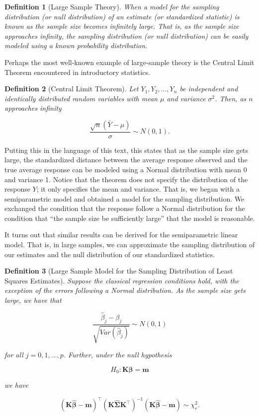 \documentclass[
]{book}
\theoremstyle{plain}
\theoremstyle{mydefn}
\newtheorem{definition}{Definition}[chapter]
\theoremstyle{myexmpl}
\theoremstyle{remark}
\begin{document}
\begin{definition}[Large Sample Theory]
When a model for the sampling distribution (or null distribution) of an estimate (or standardized statistic) is known as the sample size becomes infinitely large. That is, as the sample size approaches infinity, the sampling distribution (or null distribution) can be easily modeled using a known probability distribution.
\end{definition}

Perhaps the most well-known example of large-sample theory is the Central Limit Theorem encountered in introductory statistics.

\begin{definition}[Central Limit Theorem]
Let \(Y_1, Y_2, \dotsc, Y_n\) be independent and identically distributed random variables with mean \(\mu\) and variance \(\sigma^2\). Then, as \(n\) approaches infinity

\[\frac{\sqrt{n}\left(\bar{Y} - \mu\right)}{\sigma} \sim N(0, 1).\]
\end{definition}

Putting this in the language of this text, this states that as the sample size gets large, the standardized distance between the average response observed and the true average response can be modeled using a Normal distribution with mean 0 and variance 1. Notice that the theorem does not specify the distribution of the response \(Y\); it only specifies the mean and variance. That is, we began with a semiparametric model and obtained a model for the sampling distribution. We exchanged the condition that the response follow a Normal distribution for the condition that ``the sample size be sufficiently large'' that the model is reasonable.

It turns out that similar results can be derived for the semiparametric linear model. That is, in large samples, we can approximate the sampling distribution of our estimates and the null distribution of our standardized statistics.

\begin{definition}[Large Sample Model for the Sampling Distribution of Least Squares Estimates]
Suppose the classical regression conditions hold, with the exception of the errors following a Normal distribution. As the sample size gets large, we have that

\[\frac{\widehat{\beta}_j - \beta_j}{\sqrt{Var\left(\widehat{\beta}_j\right)}} \sim N(0, 1)\]

for all \(j = 0, 1, \dotsc, p\). Further, under the null hypothesis

\[H_0: \mathbf{K}\boldsymbol{\beta} = \mathbf{m}\]

we have

\[\left(\mathbf{K}\widehat{\boldsymbol{\beta}} - \mathbf{m}\right)^\top \left(\mathbf{K}\widehat{\boldsymbol{\Sigma}}\mathbf{K}^\top\right)^{-1} \left(\mathbf{K}\widehat{\boldsymbol{\beta}} - \mathbf{m}\right) \sim \chi^2_r.\]
\end{definition}
\end{document}
